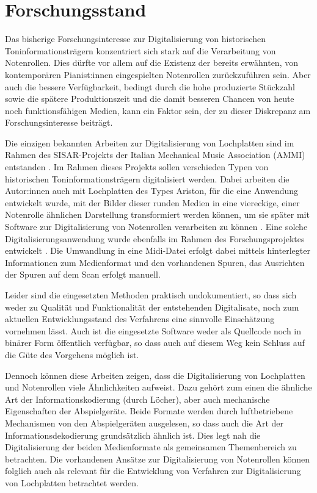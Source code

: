 \section{Forschungsstand} \label{Forschungsstand}

Das bisherige Forschungsinteresse zur Digitalisierung von historischen Toninformationsträgern konzentriert sich stark auf die Verarbeitung von Notenrollen.
Dies dürfte vor allem auf die Existenz der bereits erwähnten, von kontemporären Pianist:innen eingespielten Notenrollen zurückzuführen sein.
Aber auch die bessere Verfügbarkeit, bedingt durch die hohe produzierte Stückzahl sowie die spätere Produktionszeit und die damit besseren Chancen von heute noch funktionsfähigen Medien, kann ein Faktor sein, der zu dieser Diskrepanz am Forschungsinteresse beiträgt.

Die einzigen bekannten Arbeiten zur Digitalisierung von Lochplatten sind im Rahmen des SISAR-Projekts der Italian Mechanical Music Association (AMMI) entstanden \parencite[]{pedrazzini_2013,perretti_2014}.
Im Rahmen dieses Projekts sollen verschieden Typen von historischen Toninformationsträgern digitalisiert werden.
Dabei arbeiten die Autor:innen auch mit Lochplatten des Types Ariston, für die eine Anwendung entwickelt wurde, mit der Bilder dieser runden Medien in eine viereckige, einer Notenrolle ähnlichen Darstellung transformiert werden können, um sie später mit Software zur Digitalisierung von Notenrollen verarbeiten zu können \parencite[]{perretti_2014}.
Eine solche Digitalisierungsanwendung wurde ebenfalls im Rahmen des Forschungsprojektes entwickelt \parencite[]{conversion}.
Die Umwandlung in eine Midi-Datei erfolgt dabei mittels hinterlegter Informationen zum Medienformat und den vorhandenen Spuren, das Ausrichten der Spuren auf dem Scan erfolgt manuell.

Leider sind die eingesetzten Methoden praktisch undokumentiert, so dass sich weder zu Qualität und Funktionalität der entstehenden Digitalisate, noch zum aktuellen Entwicklungsstand des Verfahrens eine sinnvolle Einschätzung vornehmen lässt.
Auch ist die eingesetzte Software weder als Quellcode noch in binärer Form öffentlich verfügbar, so dass auch auf diesem Weg kein Schluss auf die Güte des Vorgehens möglich ist.

Dennoch können diese Arbeiten zeigen, dass die Digitalisierung von Lochplatten und Notenrollen viele Ähnlichkeiten aufweist.
Dazu gehört zum einen die ähnliche Art der Informationskodierung (durch Löcher), aber auch mechanische Eigenschaften der Abspielgeräte.
Beide Formate werden durch luftbetriebene Mechanismen von den Abspielgeräten ausgelesen, so dass auch die Art der Informationsdekodierung grundsätzlich ähnlich ist.
Dies legt nah die Digitalisierung der beiden Medienformate als gemeinsamen Themenbereich zu betrachten.
Die vorhandenen Ansätze zur Digitalisierung von Notenrollen können folglich auch als relevant für die Entwicklung von Verfahren zur Digitalisierung von Lochplatten betrachtet werden.

